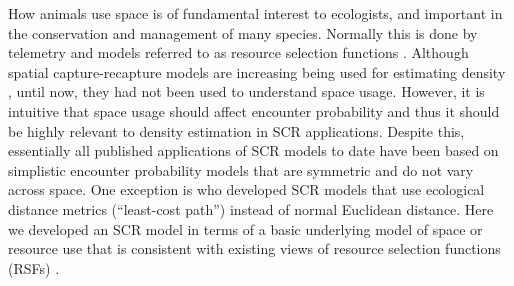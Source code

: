 \documentclass[12pt]{article}
\begin{document}
How animals use space is of
fundamental interest to ecologists, and
important in the conservation and management of many species.
Normally this is done by telemetry and models referred to as resource
selection functions \citep{manly_etal:2002}.
Although spatial capture-recapture models are increasing being used
for estimating density
\citep{efford:2004,borchers_efford:2008, royle:2008,
  efford_etal:2009ecol,royle_etal:2009ecol, gardner_etal:2010ecol,
  gardner_etal:2010jwm, kery_etal:2011,
  sollmann_etal:2011,mollet_etal:2012,gopalaswamy_etal:2012ecol},
until now, they had not been used to understand space usage.
However, it is intuitive that space usage should affect encounter
probability and thus it should be highly relevant to density
estimation in SCR applications. Despite this,
essentially all published applications of SCR models to date have been
based on simplistic encounter probability models that are symmetric
and do not vary across space. One exception is
\citet{royle_etal:2012ecol} who developed SCR models that use
ecological distance metrics (``least-cost path'') instead of normal
Euclidean distance. Here we developed an SCR model in terms of a basic
underlying model of space or resource use that is consistent with
existing views of resource selection functions (RSFs)
\citep{manly_etal:2002}.
\end{document}

